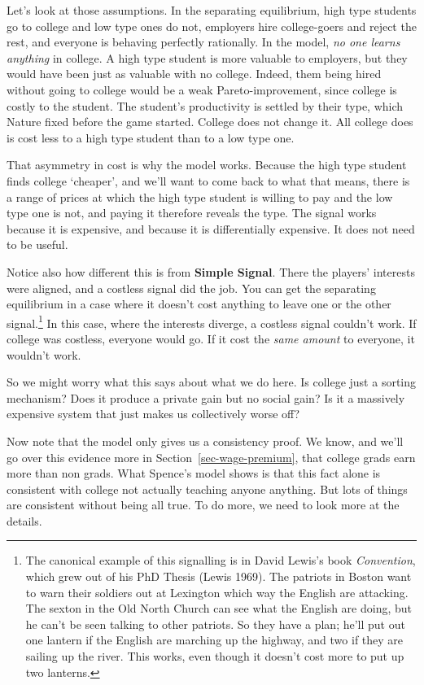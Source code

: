 \documentclass[
  11pt,
  letterpaper,
]{scrbook}
\begin{document}
Let's look at those assumptions. In the separating equilibrium, high
type students go to college and low type ones do not, employers hire
college-goers and reject the rest, and everyone is behaving perfectly
rationally. In the model, \emph{no one learns anything} in college. A
high type student is more valuable to employers, but they would have
been just as valuable with no college. Indeed, them being hired without
going to college would be a weak Pareto-improvement, since college is
costly to the student. The student's productivity is settled by their
type, which Nature fixed before the game started. College does not
change it. All college does is cost less to a high type student than to
a low type one.

That asymmetry in cost is why the model works. Because the high type
student finds college `cheaper', and we'll want to come back to what
that means, there is a range of prices at which the high type student is
willing to pay and the low type one is not, and paying it therefore
reveals the type. The signal works because it is expensive, and because
it is differentially expensive. It does not need to be useful.

Notice also how different this is from \textbf{Simple Signal}. There the
players' interests were aligned, and a costless signal did the job. You
can get the separating equilibrium in a case where it doesn't cost
anything to leave one or the other signal.\footnote{The canonical
  example of this signalling is in David Lewis's book \emph{Convention},
  which grew out of his PhD Thesis (Lewis 1969). The patriots in Boston
  want to warn their soldiers out at Lexington which way the English are
  attacking. The sexton in the Old North Church can see what the English
  are doing, but he can't be seen talking to other patriots. So they
  have a plan; he'll put out one lantern if the English are marching up
  the highway, and two if they are sailing up the river. This works,
  even though it doesn't cost more to put up two lanterns.} In this
case, where the interests diverge, a costless signal couldn't work. If
college was costless, everyone would go. If it cost the \emph{same
amount} to everyone, it wouldn't work.

So we might worry what this says about what we do here. Is college just
a sorting mechanism? Does it produce a private gain but no social gain?
Is it a massively expensive system that just makes us collectively worse
off?

Now note that the model only gives us a consistency proof. We know, and
we'll go over this evidence more in Section~\ref{sec-wage-premium}, that
college grads earn more than non grads. What Spence's model shows is
that this fact alone is consistent with college not actually teaching
anyone anything. But lots of things are consistent without being all
true. To do more, we need to look more at the details.
\end{document}
